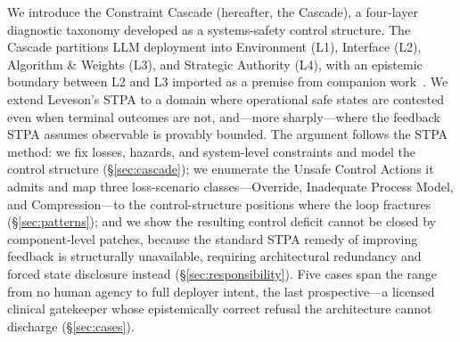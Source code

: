 \documentclass[11pt]{article}
\begin{document}
We introduce the Constraint Cascade (hereafter, the Cascade), a four-layer diagnostic taxonomy developed as a systems-safety control structure. The Cascade partitions LLM deployment into Environment (L1), Interface (L2), Algorithm \& Weights (L3), and Strategic Authority (L4), with an epistemic boundary between L2 and L3 imported as a premise from companion work~\cite{anon2026dual}. We extend Leveson's STPA to a domain where operational safe states are contested even when terminal outcomes are not, and---more sharply---where the feedback STPA assumes observable is provably bounded. The argument follows the STPA method: we fix losses, hazards, and system-level constraints and model the control structure (\S\ref{sec:cascade}); we enumerate the Unsafe Control Actions it admits and map three loss-scenario classes---Override, Inadequate Process Model, and Compression---to the control-structure positions where the loop fractures (\S\ref{sec:patterns}); and we show the resulting control deficit cannot be closed by component-level patches, because the standard STPA remedy of improving feedback is structurally unavailable, requiring architectural redundancy and forced state disclosure instead (\S\ref{sec:responsibility}). Five cases span the range from no human agency to full deployer intent, the last prospective---a licensed clinical gatekeeper whose epistemically correct refusal the architecture cannot discharge (\S\ref{sec:cases}).
\end{document}

